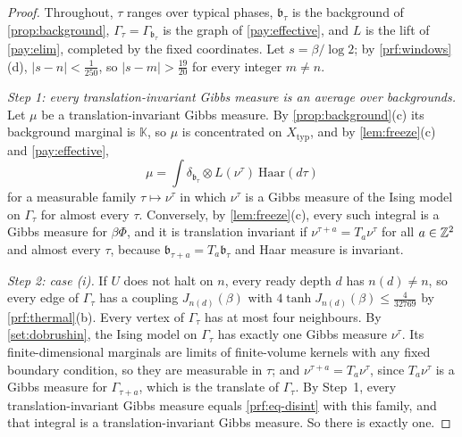 \begin{proof}
Throughout, $\tau$ ranges over typical phases, $\mathfrak b_\tau$ is the background of \cref{prop:background}, $\Gamma_\tau=\Gamma_{\mathfrak b_\tau}$ is the graph of \cref{pay:effective}, and $L$ is the lift of \cref{pay:elim}, completed by the fixed coordinates. Let $s=\beta/\log2$; by \cref{prf:windows}(d), $|s-n|<\frac1{250}$, so $|s-m|>\frac{19}{20}$ for every integer $m\ne n$.

\emph{Step 1: every translation-invariant Gibbs measure is an average over backgrounds.} Let $\mu$ be a translation-invariant Gibbs measure. By \cref{prop:background}(c) its background marginal is $\mathbb K$, so $\mu$ is concentrated on $X_{\mathrm{typ}}$, and by \cref{lem:freeze}(c) and \cref{pay:effective},
\begin{equation}\label{prf:eq-disint}
\mu=\int\delta_{\mathfrak b_\tau}\otimes L(\nu^\tau)\ \mathrm{Haar}(d\tau)
\end{equation}
for a measurable family $\tau\mapsto\nu^\tau$ in which $\nu^\tau$ is a Gibbs measure of the Ising model on $\Gamma_\tau$ for almost every $\tau$. Conversely, by \cref{lem:freeze}(c), every such integral is a Gibbs measure for $\beta\Phi$, and it is translation invariant if $\nu^{\tau+a}=T_a\nu^\tau$ for all $a\in\mathbb{Z}^2$ and almost every $\tau$, because $\mathfrak b_{\tau+a}=T_a\mathfrak b_\tau$ and Haar measure is invariant.

\emph{Step 2: case (i).} If $U$ does not halt on $n$, every ready depth $d$ has $n(d)\ne n$, so every edge of $\Gamma_\tau$ has a coupling $J_{n(d)}(\beta)$ with $4\tanh J_{n(d)}(\beta)\le\frac4{32769}$ by \cref{prf:thermal}(b). Every vertex of $\Gamma_\tau$ has at most four neighbours. By \cref{set:dobrushin}, the Ising model on $\Gamma_\tau$ has exactly one Gibbs measure $\nu^\tau$. Its finite-dimensional marginals are limits of finite-volume kernels with any fixed boundary condition, so they are measurable in $\tau$; and $\nu^{\tau+a}=T_a\nu^\tau$, since $T_a\nu^\tau$ is a Gibbs measure for $\Gamma_{\tau+a}$, which is the translate of $\Gamma_\tau$. By Step~1, every translation-invariant Gibbs measure equals \eqref{prf:eq-disint} with this family, and that integral is a translation-invariant Gibbs measure. So there is exactly one.


\end{proof}
